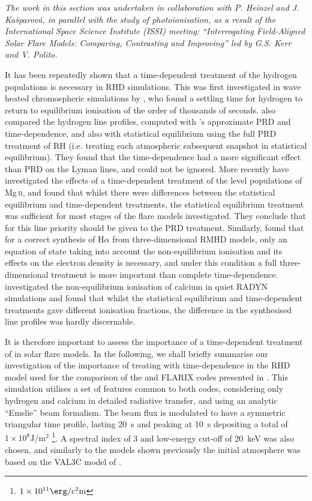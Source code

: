 \emph{The work in this section was undertaken in collaboration with P. Heinzel and J. Kašparová, in parallel with the study of \Caii{} photoionisation, as a result of the International Space Science Institute (ISSI) meeting: ``Interrogating Field-Aligned Solar Flare Models: Comparing, Contrasting and Improving'' led by G.S. Kerr and V. Polito.}

It has been repeatedly shown that a time-dependent treatment of the hydrogen populations is necessary in RHD simulations.
This was first investigated in wave heated chromospheric simulations by \citet{Carlsson2002}, who found a settling time for hydrogen to return to equilibrium ionisation of the order of thousands of seconds.
\citet{Brown2018} also compared the hydrogen line profiles, computed with \Radyn{}'s approximate PRD and time-dependence, and also with statistical equilibrium using the full PRD treatment of RH (i.e. treating each atmospheric subsequent snapshot in statistical equilibrium).
They found that the time-dependence had a more significant effect than PRD on the Lyman lines, and could not be ignored.
More recently \citet{Kerr2019a} have investigated the effects of a time-dependent treatment of the level populations of Mg\,\textsc{ii}, and found that whilst there were differences between the statistical equilibrium and time-dependent treatments, the statistical equilibrium treatment was sufficient for most stages of the flare models investigated.
They conclude that for this line priority should be given to the PRD treatment.
Similarly, \citet{Leenaarts2012a} found that for a correct synthesis of H$\alpha$ from three-dimensional RMHD models, only an equation of state taking into account the non-equilibrium ionisation and its effects on the electron density is necessary, and under this condition a full three-dimensional treatment is more important than complete time-dependence.
\citet{Wedemeyer-Bohm2011} investigated the non-equilibrium ionisation of calcium in quiet RADYN simulations and found that whilst the statistical equilibrium and time-dependent treatments gave different ionisation fractions, the difference in the synthesised line profiles was hardly discernable.

It is therefore important to assess the importance of a time-dependent treatment of \Caii{} in solar flare models.
In the following, we shall briefly summarise our investigation of the importance of treating \Caii{} with time-dependence in the RHD model used for the comparison of the \Radyn{} and FLARIX codes presented in \citet{Kasparova2019}.
This simulation utilises a set of features common to both codes, considering only hydrogen and calcium in detailed radiative transfer, and using an analytic ``Emslie'' beam formalism.
The beam flux is modulated to have a symmetric triangular time profile, lasting \SI{20}{\second} and peaking at \SI{10}{\second} depositing a total of $1\times{}10^8\si{\joule\per\square\metre}$ \footnote{$1\times{}10^{11}\si{\erg\per\square\centi\metre}$}.
A spectral index of 3 and low-energy cut-off of \SI{20}{\kilo\electronvolt} was also chosen, and similarly to the models shown previously the initial atmosphere was based on the VAL3C model of \citet{Vernazza1981}.

